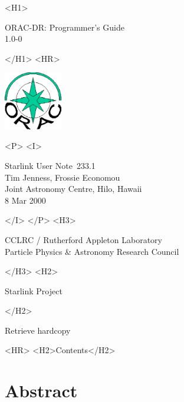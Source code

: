 \documentclass[twoside,11pt]{article}
\newcommand{\stardoccategory}  {Starlink User Note}
\newcommand{\stardocsource}    {sun\stardocnumber}
\newcommand{\stardocnumber}    {233.1}
\newcommand{\stardocauthors}   {Tim Jenness, Frossie Economou\\
Joint Astronomy Centre, Hilo, Hawaii}
\newcommand{\stardocdate}      {8 Mar 2000}
\newcommand{\stardoctitle}     {ORAC-DR: Programmer's Guide}
\newcommand{\stardocversion}   {1.0-0}
\newcommand{\stardocmanual}    {}
\newcommand{\htmladdnormallink}[2]{#1}
\newcommand{\htmladdimg}[1]{}
\newcommand{\htmlref}[2]{#1}
\newcommand{\htmladdtonavigation}[1]{}
\newcommand{\xlabel}[1]{}
\renewcommand{\_}{\texttt{\symbol{95}}}
\begin{document}
\begin{htmlonly}
   \xlabel{}
   \begin{rawhtml} <H1> \end{rawhtml}
      \stardoctitle\\
      \stardocversion\\
      \stardocmanual
   \begin{rawhtml} </H1> <HR> \end{rawhtml}

\includegraphics[width=1.0in]{sun233_logo.eps}

   \begin{rawhtml} <P> <I> \end{rawhtml}
   \stardoccategory\ \stardocnumber \\
   \stardocauthors \\
   \stardocdate
   \begin{rawhtml} </I> </P> <H3> \end{rawhtml}
      \htmladdnormallink{CCLRC / Rutherford Appleton Laboratory}
                        {http://www.cclrc.ac.uk} \\
      \htmladdnormallink{Particle Physics \& Astronomy Research Council}
                        {http://www.pparc.ac.uk} \\
   \begin{rawhtml} </H3> <H2> \end{rawhtml}
      \htmladdnormallink{Starlink Project}{http://www.starlink.rl.ac.uk/}
   \begin{rawhtml} </H2> \end{rawhtml}
   \htmladdnormallink{\htmladdimg{source.gif} Retrieve hardcopy}
      {http://www.starlink.rl.ac.uk/cgi-bin/hcserver?\stardocsource}\\

  \label{stardoccontents}
  \begin{rawhtml} 
    <HR>
    <H2>Contents</H2>
  \end{rawhtml}
  \htmladdtonavigation{\htmlref{\htmladdimg{contents_motif.gif}}
        {stardoccontents}}

  \section{\xlabel{abstract}Abstract}
\end{htmlonly}
\end{document}
